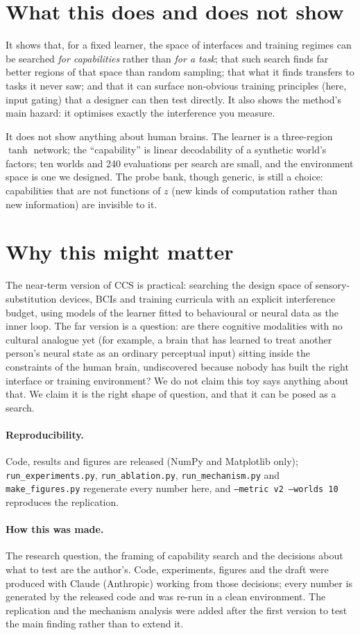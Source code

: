 \documentclass[11pt]{article}
\begin{document}
\section{What this does and does not show}
It shows that, for a fixed learner, the space of interfaces and training regimes can be searched
\emph{for capabilities} rather than \emph{for a task}; that such search finds far better regions
of that space than random sampling; that what it finds transfers to tasks it never saw; and that
it can surface non-obvious training principles (here, input gating) that a designer can then test
directly. It also shows the method's main hazard: it optimises exactly the interference you
measure.

It does not show anything about human brains. The learner is a three-region $\tanh$ network; the
``capability'' is linear decodability of a synthetic world's factors; ten worlds and 240
evaluations per search are small, and the environment space is one we designed. The probe bank, though generic, is still a choice: capabilities that are
not functions of $z$ (new kinds of computation rather than new information) are invisible to it.

\section{Why this might matter}
The near-term version of CCS is practical: searching the design space of sensory-substitution
devices, BCIs and training curricula with an explicit interference budget, using models of the
learner fitted to behavioural or neural data as the inner loop. The far version is a question:
are there cognitive modalities with no cultural analogue yet (for example, a brain that has
learned to treat another person's neural state as an ordinary perceptual input) sitting inside
the constraints of the human brain, undiscovered because nobody has built the right interface or
training environment? We do not claim this toy says anything about that. We claim it is the right
shape of question, and that it can be posed as a search.

\paragraph{Reproducibility.} Code, results and figures are released (NumPy and Matplotlib
only); \texttt{run\_experiments.py}, \texttt{run\_ablation.py}, \texttt{run\_mechanism.py} and
\texttt{make\_figures.py} regenerate every number here, and \texttt{--metric v2 --worlds 10}
reproduces the replication.

\paragraph{How this was made.} The research question, the framing of capability search and the
decisions about what to test are the author's. Code, experiments, figures and the draft were
produced with Claude (Anthropic) working from those decisions; every number is generated by the
released code and was re-run in a clean environment. The replication and the mechanism analysis
were added after the first version to test the main finding rather than to extend it.

\small


\end{document}
